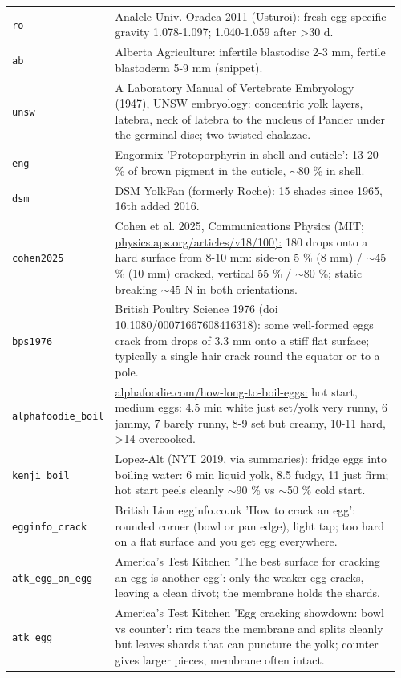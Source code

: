 \documentclass[10.5pt,a4paper]{article}
\begin{document}
{\begin{longtable}{@{}p{0.16\linewidth}p{0.8\linewidth}@{}}
\texttt{ro} & Analele Univ. Oradea 2011 (Usturoi): fresh egg specific gravity 1.078-1.097; 1.040-1.059 after >30 d. \\
\texttt{ab} & Alberta Agriculture: infertile blastodisc 2-3 mm, fertile blastoderm 5-9 mm (snippet). \\
\texttt{unsw} & A Laboratory Manual of Vertebrate Embryology (1947), UNSW embryology: concentric yolk layers, latebra, neck of latebra to the nucleus of Pander under the germinal disc; two twisted chalazae. \\
\texttt{eng} & Engormix 'Protoporphyrin in shell and cuticle': 13-20 \% of brown pigment in the cuticle, $\sim$80 \% in shell. \\
\texttt{dsm} & DSM YolkFan (formerly Roche): 15 shades since 1965, 16th added 2016. \\
\texttt{cohen2025} & Cohen et al. 2025, Communications Physics (MIT; \url{physics.aps.org/articles/v18/100):} 180 drops onto a hard surface from 8-10 mm: side-on 5 \% (8 mm) / $\sim$45 \% (10 mm) cracked, vertical 55 \% / $\sim$80 \%; static breaking $\sim$45 N in both orientations. \\
\texttt{bps1976} & British Poultry Science 1976 (doi 10.1080/00071667608416318): some well-formed eggs crack from drops of 3.3 mm onto a stiff flat surface; typically a single hair crack round the equator or to a pole. \\
\texttt{alphafoodie\_\allowbreak{}boil} & \url{alphafoodie.com/how-long-to-boil-eggs:} hot start, medium eggs: 4.5 min white just set/yolk very runny, 6 jammy, 7 barely runny, 8-9 set but creamy, 10-11 hard, >14 overcooked. \\
\texttt{kenji\_\allowbreak{}boil} & Lopez-Alt (NYT 2019, via summaries): fridge eggs into boiling water: 6 min liquid yolk, 8.5 fudgy, 11 just firm; hot start peels cleanly $\sim$90 \% vs $\sim$50 \% cold start. \\
\texttt{egginfo\_\allowbreak{}crack} & British Lion egginfo.co.uk 'How to crack an egg': rounded corner (bowl or pan edge), light tap; too hard on a flat surface and you get egg everywhere. \\
\texttt{atk\_\allowbreak{}egg\_\allowbreak{}on\_\allowbreak{}egg} & America's Test Kitchen 'The best surface for cracking an egg is another egg': only the weaker egg cracks, leaving a clean divot; the membrane holds the shards. \\
\texttt{atk\_\allowbreak{}egg} & America's Test Kitchen 'Egg cracking showdown: bowl vs counter': rim tears the membrane and splits cleanly but leaves shards that can puncture the yolk; counter gives larger pieces, membrane often intact. \\

\end{longtable}}
\end{document}
